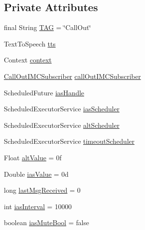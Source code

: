\subsection*{Private Attributes}
\begin{DoxyCompactItemize}
\item 
final String \hyperlink{classpt_1_1lsts_1_1asa_1_1feedback_1_1CallOut_aa75bdeac73953fe2c57dea3c8f0f0b73}{T\+A\+G} = \char`\"{}Call\+Out\char`\"{}
\item 
Text\+To\+Speech \hyperlink{classpt_1_1lsts_1_1asa_1_1feedback_1_1CallOut_ada6aee96c4012231f3083fdc30557503}{tts}
\item 
Context \hyperlink{classpt_1_1lsts_1_1asa_1_1feedback_1_1CallOut_ae2847d0ea493a1763d4928c06fd19090}{context}
\item 
\hyperlink{classpt_1_1lsts_1_1asa_1_1subscribers_1_1CallOutIMCSubscriber}{Call\+Out\+I\+M\+C\+Subscriber} \hyperlink{classpt_1_1lsts_1_1asa_1_1feedback_1_1CallOut_abfab7a06d71e699640dd3d62176f3b47}{call\+Out\+I\+M\+C\+Subscriber}
\item 
Scheduled\+Future \hyperlink{classpt_1_1lsts_1_1asa_1_1feedback_1_1CallOut_a9689da549341230842c8d930633f950f}{ias\+Handle}
\item 
Scheduled\+Executor\+Service \hyperlink{classpt_1_1lsts_1_1asa_1_1feedback_1_1CallOut_aaec22efe923c2b8ad2e347a619a47d6d}{ias\+Scheduler}
\item 
Scheduled\+Executor\+Service \hyperlink{classpt_1_1lsts_1_1asa_1_1feedback_1_1CallOut_a6527867b61d0e30602aef84ab733062a}{alt\+Scheduler}
\item 
Scheduled\+Executor\+Service \hyperlink{classpt_1_1lsts_1_1asa_1_1feedback_1_1CallOut_ab9d2ddff0dddef8a356da30528da4f1e}{timeout\+Scheduler}
\item 
Float \hyperlink{classpt_1_1lsts_1_1asa_1_1feedback_1_1CallOut_a2d26c980dd82169789dad88bf86666ee}{alt\+Value} = 0f
\item 
Double \hyperlink{classpt_1_1lsts_1_1asa_1_1feedback_1_1CallOut_a6185a47dfdbf7690e1ab9db99d8a41da}{ias\+Value} = 0d
\item 
long \hyperlink{classpt_1_1lsts_1_1asa_1_1feedback_1_1CallOut_a5a64e34dcc12acad25b1a68f2eaa5e13}{last\+Msg\+Received} = 0
\item 
int \hyperlink{classpt_1_1lsts_1_1asa_1_1feedback_1_1CallOut_a6dda52076ca54ce6b2b2cfd9146170e7}{ias\+Interval} = 10000
\item 
boolean \hyperlink{classpt_1_1lsts_1_1asa_1_1feedback_1_1CallOut_aa25d69118ba8f8a67d9a00111f251212}{ias\+Mute\+Bool} = false
\end{DoxyCompactItemize}


